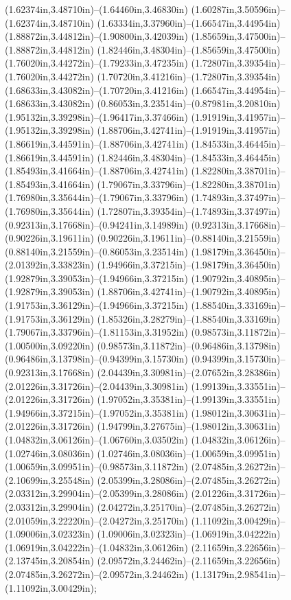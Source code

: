 (1.62374in,3.48710in)--(1.64460in,3.46830in) (1.60287in,3.50596in)--(1.62374in,3.48710in) (1.63334in,3.37960in)--(1.66547in,3.44954in) (1.88872in,3.44812in)--(1.90800in,3.42039in) (1.85659in,3.47500in)--(1.88872in,3.44812in) (1.82446in,3.48304in)--(1.85659in,3.47500in) (1.76020in,3.44272in)--(1.79233in,3.47235in) (1.72807in,3.39354in)--(1.76020in,3.44272in) (1.70720in,3.41216in)--(1.72807in,3.39354in) (1.68633in,3.43082in)--(1.70720in,3.41216in) (1.66547in,3.44954in)--(1.68633in,3.43082in) (0.86053in,3.23514in)--(0.87981in,3.20810in) (1.95132in,3.39298in)--(1.96417in,3.37466in) (1.91919in,3.41957in)--(1.95132in,3.39298in) (1.88706in,3.42741in)--(1.91919in,3.41957in) (1.86619in,3.44591in)--(1.88706in,3.42741in) (1.84533in,3.46445in)--(1.86619in,3.44591in) (1.82446in,3.48304in)--(1.84533in,3.46445in) (1.85493in,3.41664in)--(1.88706in,3.42741in) (1.82280in,3.38701in)--(1.85493in,3.41664in) (1.79067in,3.33796in)--(1.82280in,3.38701in) (1.76980in,3.35644in)--(1.79067in,3.33796in) (1.74893in,3.37497in)--(1.76980in,3.35644in) (1.72807in,3.39354in)--(1.74893in,3.37497in) (0.92313in,3.17668in)--(0.94241in,3.14989in) (0.92313in,3.17668in)--(0.90226in,3.19611in) (0.90226in,3.19611in)--(0.88140in,3.21559in) (0.88140in,3.21559in)--(0.86053in,3.23514in) (1.98179in,3.36450in)--(2.01392in,3.33823in) (1.94966in,3.37215in)--(1.98179in,3.36450in) (1.92879in,3.39053in)--(1.94966in,3.37215in) (1.90792in,3.40895in)--(1.92879in,3.39053in) (1.88706in,3.42741in)--(1.90792in,3.40895in) (1.91753in,3.36129in)--(1.94966in,3.37215in) (1.88540in,3.33169in)--(1.91753in,3.36129in) (1.85326in,3.28279in)--(1.88540in,3.33169in) (1.79067in,3.33796in)--(1.81153in,3.31952in) (0.98573in,3.11872in)--(1.00500in,3.09220in) (0.98573in,3.11872in)--(0.96486in,3.13798in) (0.96486in,3.13798in)--(0.94399in,3.15730in) (0.94399in,3.15730in)--(0.92313in,3.17668in) (2.04439in,3.30981in)--(2.07652in,3.28386in) (2.01226in,3.31726in)--(2.04439in,3.30981in) (1.99139in,3.33551in)--(2.01226in,3.31726in) (1.97052in,3.35381in)--(1.99139in,3.33551in) (1.94966in,3.37215in)--(1.97052in,3.35381in) (1.98012in,3.30631in)--(2.01226in,3.31726in) (1.94799in,3.27675in)--(1.98012in,3.30631in) (1.04832in,3.06126in)--(1.06760in,3.03502in) (1.04832in,3.06126in)--(1.02746in,3.08036in) (1.02746in,3.08036in)--(1.00659in,3.09951in) (1.00659in,3.09951in)--(0.98573in,3.11872in) (2.07485in,3.26272in)--(2.10699in,3.25548in) (2.05399in,3.28086in)--(2.07485in,3.26272in) (2.03312in,3.29904in)--(2.05399in,3.28086in) (2.01226in,3.31726in)--(2.03312in,3.29904in) (2.04272in,3.25170in)--(2.07485in,3.26272in) (2.01059in,3.22220in)--(2.04272in,3.25170in) (1.11092in,3.00429in)--(1.09006in,3.02323in) (1.09006in,3.02323in)--(1.06919in,3.04222in) (1.06919in,3.04222in)--(1.04832in,3.06126in) (2.11659in,3.22656in)--(2.13745in,3.20854in) (2.09572in,3.24462in)--(2.11659in,3.22656in) (2.07485in,3.26272in)--(2.09572in,3.24462in) (1.13179in,2.98541in)--(1.11092in,3.00429in);
